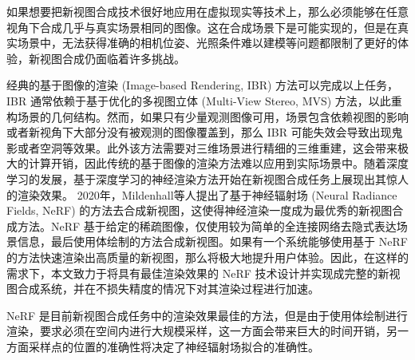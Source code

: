 如果想要把新视图合成技术很好地应用在虚拟现实等技术上，那么必须能够在任意视角下合成几乎与真实场景相同的图像。这在合成场景下是可能实现的，但是在真实场景中，无法获得准确的相机位姿、光照条件难以建模等问题都限制了更好的体验，新视图合成仍面临着许多挑战。




经典的基于图像的渲染 (Image-based Rendering, IBR\cite{kee2013exposing}) 方法可以完成以上任务，IBR 通常依赖于基于优化的多视图立体 (Multi-View Stereo, MVS) 方法，以此重构场景的几何结构。然而，如果只有少量观测图像可用，场景包含依赖视图的影响或者新视角下大部分没有被观测的图像覆盖到，那么 IBR 可能失效会导致出现鬼影或者空洞等效果。此外该方法需要对三维场景进行精细的三维重建，这会带来极大的计算开销，因此传统的基于图像的渲染方法难以应用到实际场景中。随着深度学习的发展，基于深度学习的神经渲染方法开始在新视图合成任务上展现出其惊人的渲染效果。
2020年，Mildenhall等人\cite{mildenhall2020nerf}提出了基于神经辐射场 (Neural Radiance Fields, NeRF) 的方法去合成新视图，这使得神经渲染一度成为最优秀的新视图合成方法。NeRF 基于给定的稀疏图像，仅使用较为简单的全连接网络去隐式表达场景信息，最后使用体绘制的方法合成新视图。如果有一个系统能够使用基于 NeRF 的方法快速渲染出高质量的新视图，那么将极大地提升用户体验。因此，在这样的需求下，本文致力于将具有最佳渲染效果的 NeRF 技术设计并实现成完整的新视图合成系统，并在不损失精度的情况下对其渲染过程进行加速。

NeRF 是目前新视图合成任务中的渲染效果最佳的方法，但是由于使用体绘制进行渲染，要求必须在空间内进行大规模采样，这一方面会带来巨大的时间开销，另一方面采样点的位置的准确性将决定了神经辐射场拟合的准确性。

